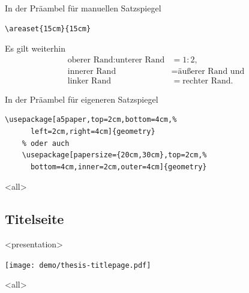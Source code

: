 \begin{Block}{In der Präambel für manuellen Satzspiegel}
  \begin{lstlisting}[gobble=4,style=block]
    \areaset{15cm}{15cm}
  \end{lstlisting}
  Es gilt weiterhin
  \begin{align*}
    \text{oberer\ Rand} : \text{unterer\ Rand} &= 1 : 2, \\
    \text{innerer\ Rand} &= \text{äußerer\ Rand} \text{ und} \\
    \text{linker\ Rand} &= \text{rechter\ Rand}.
  \end{align*}
\end{Block}

\begin{Block}{In der Präambel für eigeneren Satzspiegel}
  \begin{lstlisting}[gobble=4,style=block]
    \usepackage[a5paper,top=2cm,bottom=4cm,%
      left=2cm,right=4cm]{geometry}
    % oder auch
    \usepackage[papersize={20cm,30cm},top=2cm,%
      bottom=4cm,inner=2cm,outer=4cm]{geometry}
  \end{lstlisting}
\end{Block}

\mode
<all>

\subsection{Titelseite}

\begin{Frame}
  \begin{center}
  \end{center}
\end{Frame}

\mode
<presentation>

\begin{Frame}
  \begin{center}
    \texttt{[image: demo/thesis-titlepage.pdf]}
  \end{center}
\end{Frame}

\mode
<all>

